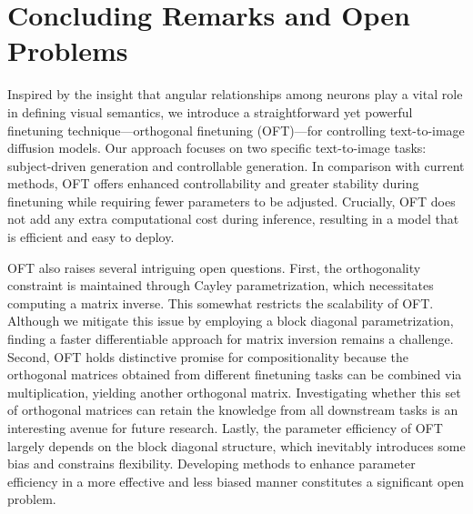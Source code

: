 \section{Concluding Remarks and Open Problems}

Inspired by the insight that angular relationships among neurons play a vital role in defining visual semantics, we introduce a straightforward yet powerful finetuning technique—orthogonal finetuning (OFT)—for controlling text-to-image diffusion models. Our approach focuses on two specific text-to-image tasks: subject-driven generation and controllable generation. In comparison with current methods, OFT offers enhanced controllability and greater stability during finetuning while requiring fewer parameters to be adjusted. Crucially, OFT does not add any extra computational cost during inference, resulting in a model that is efficient and easy to deploy.

OFT also raises several intriguing open questions. First, the orthogonality constraint is maintained through Cayley parametrization, which necessitates computing a matrix inverse. This somewhat restricts the scalability of OFT. Although we mitigate this issue by employing a block diagonal parametrization, finding a faster differentiable approach for matrix inversion remains a challenge. Second, OFT holds distinctive promise for compositionality because the orthogonal matrices obtained from different finetuning tasks can be combined via multiplication, yielding another orthogonal matrix. Investigating whether this set of orthogonal matrices can retain the knowledge from all downstream tasks is an interesting avenue for future research. Lastly, the parameter efficiency of OFT largely depends on the block diagonal structure, which inevitably introduces some bias and constrains flexibility. Developing methods to enhance parameter efficiency in a more effective and less biased manner constitutes a significant open problem.

